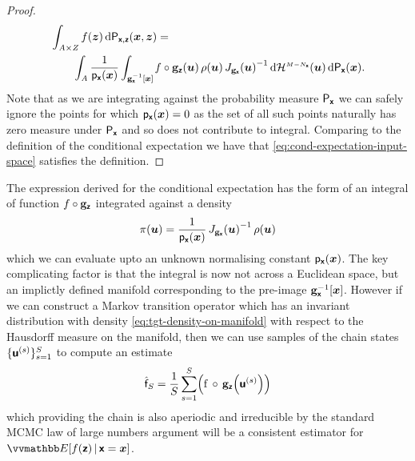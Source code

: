 \begin{proof}
\begin{equation*}
\begin{split}
  &\int_{\set{A} \times \set{Z}}
    f(\vct{z}) 
  \,\dr\prob{\rvct{x},\rvct{z}}(\vct{x},\vct{z}) =\,\\
  &\qquad
  \int_{\set{A}}
  \frac{1}{\pden{\rvct{x}}(\vct{x})}
  \int_{\preimage{\genfunc_{\rvct{x}}}{\vct{x}}}\kern-1pt
   f\circ\genfunc_{\rvct{z}}(\vct{u})\,
   \rho(\vct{u})\,
   \jacobproddet{\genfunc_{\rvct{x}}}{\vct{u}}^{-1}
  \,\dr\haum{M-{N_{\rvct{x}}}}(\vct{u})
  \,\dr\prob{\rvct{x}}(\vct{x}).
\end{split}
\end{equation*}
Note that as we are integrating against the probability measure $\mathsf{P}_{\boldsymbol{\mathsf{x}}}$ we can safely ignore the points for which $\mathsf{p}_{\boldsymbol{\mathsf{x}}}(\boldsymbol{x}) = 0$ as the set of all such points naturally has zero measure under $\mathsf{P}_{\boldsymbol{\mathsf{x}}}$ and so does not contribute to integral. Comparing to the definition of the conditional expectation we have that \eqref{eq:cond-expectation-input-space} satisfies the definition. \qedhere
\end{proof}

The expression derived for the conditional expectation has the form of an integral of function $f \circ {\mathbf{g}}_{\boldsymbol{\mathsf{z}}}$ integrated against a density
\begin{equation}\label{eq:tgt-density-on-manifold}
    \pi(\vct{u}) =
    \frac{1}{\pden{\rvct{x}}(\vct{x})}\,
    \jacobproddet{\genfunc_{\rvct{x}}}{\vct{u}}^{-1}\,
    \rho(\vct{u}) 
\end{equation}
which we can evaluate upto an unknown normalising constant $\mathsf{p}_{\boldsymbol{\mathsf{x}}}(\boldsymbol{x})$. The key complicating factor is that the integral is now not across a Euclidean space, but an implictly defined manifold corresponding to the pre-image ${\mathbf{g}}_{\boldsymbol{\mathsf{x}}}^{-1}[\boldsymbol{x}]$. However if we can construct a Markov transition operator which has an invariant distribution with density \eqref{eq:tgt-density-on-manifold} with respect to the Hausdorff measure on the manifold, then we can use samples of the chain states $\lbrace\boldsymbol{\mathsf{u}}^{(s)}\rbrace_{s=1}^S$ to compute an estimate
\begin{equation}\label{eq:mc-est-cond-expc}
    \hat{\rvar{f}}_S =
    \frac{1}{S} 
    \sum_{s=1}^S \lpa
      \func{f}\,\circ\,\genfunc_{\rvct{z}}\lpa\rvct{u}^{(s)}\rpa
    \rpa
\end{equation}
which providing the chain is also aperiodic and irreducible by the standard \ac{MCMC} law of large numbers argument will be a consistent estimator for $\expc{f(\rvct{z}) \gvn \rvct{x} = \vct{x}}$. 

